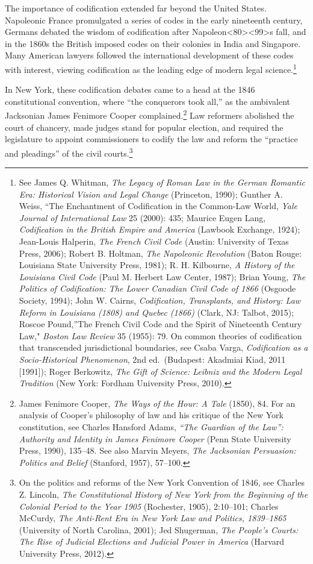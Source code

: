\documentclass[12pt,]{article}
\let\rmarkdownfootnote\footnote%
\def\footnote{\protect\rmarkdownfootnote}
\begin{document}
The importance of codification extended far beyond the United States.
Napoleonic France promulgated a series of codes in the early nineteenth
century, Germans debated the wisdom of codification after
Napoleon\textless80\textgreater\textless99\textgreater s fall, and in
the 1860s the British imposed codes on their colonies in India and
Singapore. Many American lawyers followed the international development
of these codes with interest, viewing codification as the leading edge
of modern legal science.\footnote{See James Q. Whitman, \emph{The Legacy
  of Roman Law in the German Romantic Era: Historical Vision and Legal
  Change} (Princeton, 1990); Gunther A. Weiss, ``The Enchantment of
  Codification in the Common-Law World, \emph{Yale Journal of
  International Law} 25 (2000): 435; Maurice Eugen Lang,
  \emph{Codification in the British Empire and America} (Lawbook
  Exchange, 1924); Jean-Louis Halperin, \emph{The French Civil Code}
  (Austin: University of Texas Press, 2006); Robert B. Holtman,
  \emph{The Napoleonic Revolution} (Baton Rouge: Louisiana State
  University Press, 1981); R. H. Kilbourne, \emph{A History of the
  Louisiana Civil Code} (Paul M. Herbert Law Center, 1987); Brian Young,
  \emph{The Politics of Codification: The Lower Canadian Civil Code of
  1866} (Osgoode Society, 1994); John W. Cairns, \emph{Codification,
  Transplants, and History: Law Reform in Louisiana (1808) and Quebec
  (1866)} (Clark, NJ: Talbot, 2015); Roscoe Pound,''The French Civil
  Code and the Spirit of Nineteenth Century Law," \emph{Boston Law
  Review} 35 (1955): 79. On common theories of codification that
  transcended jurisdictional boundaries, see Csaba Varga,
  \emph{Codification as a Socio-Historical Phenomenon}, 2nd
  ed.~(Budapest: Akadmiai Kiad, 2011 {[}1991{]}); Roger Berkowitz,
  \emph{The Gift of Science: Leibniz and the Modern Legal Tradition}
  (New York: Fordham University Press, 2010).}

In New York, these codification debates came to a head at the 1846
constitutional convention, where ``the conquerors took all,'' as the
ambivalent Jacksonian James Fenimore Cooper complained.\footnote{James
  Fenimore Cooper, \emph{The Ways of the Hour: A Tale} (1850), 84. For
  an analysis of Cooper's philosophy of law and his critique of the New
  York constitution, see Charles Hansford Adams, \emph{``The Guardian of
  the Law'': Authority and Identity in James Fenimore Cooper} (Penn
  State University Press, 1990), 135--48. See also Marvin Meyers,
  \emph{The Jacksonian Persuasion: Politics and Belief} (Stanford,
  1957), 57--100.} Law reformers abolished the court of chancery, made
judges stand for popular election, and required the legislature to
appoint commissioners to codify the law and reform the ``practice and
pleadings'' of the civil courts.\footnote{On the politics and reforms of
  the New York Convention of 1846, see Charles Z. Lincoln, \emph{The
  Constitutional History of New York from the Beginning of the Colonial
  Period to the Year 1905} (Rochester, 1905), 2:10--101; Charles
  McCurdy, \emph{The Anti-Rent Era in New York Law and Politics,
  1839--1865} (University of North Carolina, 2001); Jed Shugerman,
  \emph{The People's Courts: The Rise of Judicial Elections and Judicial
  Power in America} (Harvard University Press, 2012).}
\end{document}
